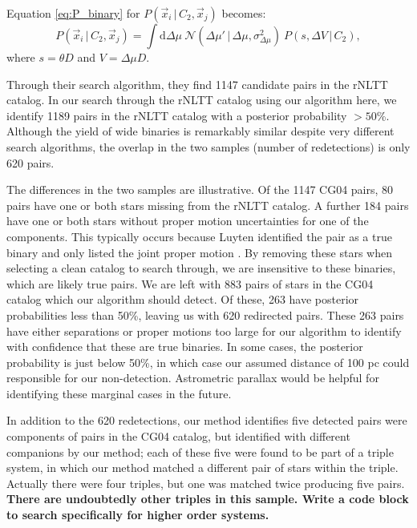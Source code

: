 \documentclass[usenatbib]{mnras}
\newcommand{\given}{\,|\,}
\newcommand{\dd}{\mathrm{d}}
\begin{document}
Equation \ref{eq:P_binary} for $P(\vec{x}_i \given C_2, \vec{x}_j)$ becomes:
\begin{equation}
P(\vec{x}_i \given C_2, \vec{x}_j) = \int \dd \Delta \mu\ 
\mathcal{N}( \Delta \mu' \given \Delta \mu, \sigma^2_{\Delta \mu} )\
P(s, \Delta V \given C_2),
\label{eq:P_binary_rNLTT}
\end{equation}
where $s = \theta D$ and $V = \Delta \mu D$. 


Through their search algorithm, they find 1147 candidate pairs in the rNLTT catalog. In our search through the rNLTT catalog using our algorithm here, we identify 1189 pairs in the rNLTT catalog with a posterior probability $>50$\%. Although the yield of wide binaries is remarkably similar despite very different search algorithms, the overlap in the two samples (number of redetections) is only 620 pairs. 

The differences in the two samples are illustrative. Of the 1147 CG04 pairs, 80 pairs have one or both stars missing from the rNLTT catalog. A further 184 pairs have one or both stars without proper motion uncertainties for one of the components. This typically occurs because Luyten identified the pair as a true binary and only listed the joint proper motion \citep{chaname04}. By removing these stars when selecting a clean catalog to search through, we are insensitive to these binaries, which are likely true pairs. We are left with 883 pairs of stars in the CG04 catalog which our algorithm should detect. Of these, 263 have posterior probabilities less than 50\%, leaving us with 620 redirected pairs. These 263 pairs have either separations or proper motions too large for our algorithm to identify with confidence that these are true binaries. In some cases, the posterior probability is just below 50\%, in which case our assumed distance of 100 pc could responsible for our non-detection. Astrometric parallax would be helpful for identifying these marginal cases in the future.



In addition to the 620 redetections, our method identifies five detected pairs were components of pairs in the CG04 catalog, but identified with different companions by our method; each of these five were found to be part of a triple system, in which our method matched a different pair of stars within the triple. Actually there were four triples, but one was matched twice producing five pairs. {\bf There are undoubtedly other triples in this sample. Write a code block to search specifically for higher order systems.}
\end{document}
